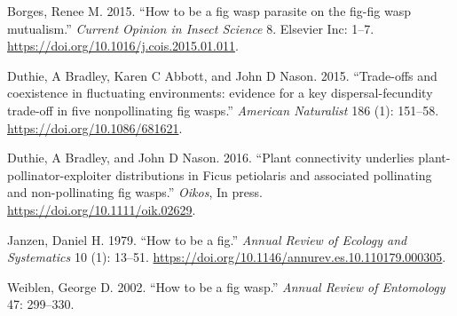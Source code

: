\documentclass[]{article}
\begin{document}
\hypertarget{refs}{}
\leavevmode\hypertarget{ref-Borges2015}{}%
Borges, Renee M. 2015. ``How to be a fig wasp parasite on the fig-fig
wasp mutualism.'' \emph{Current Opinion in Insect Science} 8. Elsevier
Inc: 1--7. \url{https://doi.org/10.1016/j.cois.2015.01.011}.

\leavevmode\hypertarget{ref-Duthie2015b}{}%
Duthie, A Bradley, Karen C Abbott, and John D Nason. 2015. ``Trade-offs
and coexistence in fluctuating environments: evidence for a key
dispersal-fecundity trade-off in five nonpollinating fig wasps.''
\emph{American Naturalist} 186 (1): 151--58.
\url{https://doi.org/10.1086/681621}.

\leavevmode\hypertarget{ref-Duthie2016}{}%
Duthie, A Bradley, and John D Nason. 2016. ``Plant connectivity
underlies plant-pollinator-exploiter distributions in Ficus petiolaris
and associated pollinating and non-pollinating fig wasps.''
\emph{Oikos}, In press. \url{https://doi.org/10.1111/oik.02629}.

\leavevmode\hypertarget{ref-Janzen1979}{}%
Janzen, Daniel H. 1979. ``How to be a fig.'' \emph{Annual Review of
Ecology and Systematics} 10 (1): 13--51.
\url{https://doi.org/10.1146/annurev.es.10.110179.000305}.

\leavevmode\hypertarget{ref-Weiblen2002}{}%
Weiblen, George D. 2002. ``How to be a fig wasp.'' \emph{Annual Review
of Entomology} 47: 299--330.
\end{document}
